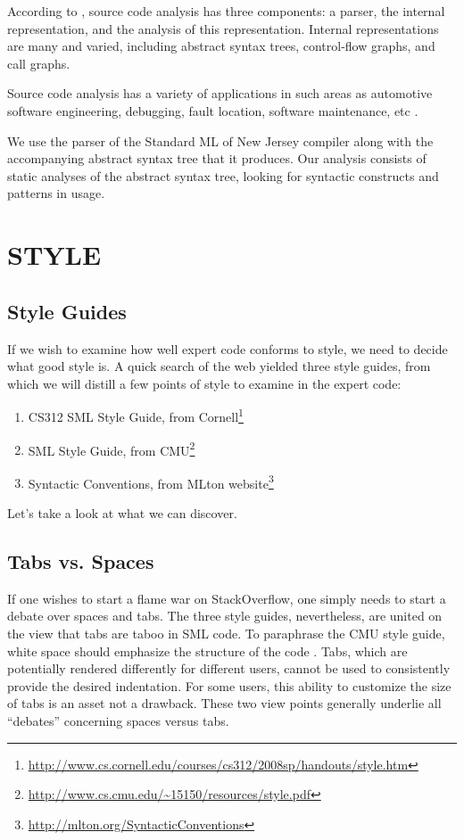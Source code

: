 \documentclass[12pt,abstracton]{scrartcl}
\begin{document}
According to \cite{Bin07}, source code analysis has three components: a parser,
the internal representation, and the analysis of this representation.
Internal representations are many and varied, including abstract syntax trees,
control-flow graphs, and call graphs.

Source code analysis has a variety of applications in such areas as
automotive software engineering, debugging, fault location, software maintenance,
etc \cite{Bin07}.

We use the parser of the Standard ML of New Jersey compiler along with the accompanying
abstract syntax tree that it produces. Our analysis
consists of static analyses of the abstract syntax tree, looking for
syntactic constructs and patterns in usage.
\section{STYLE}\label{sec:style}
\subsection{Style Guides}\label{subsec:guide}
If we wish to examine how well expert code conforms to style, we need to decide
what good style is. A quick search of the web yielded three style guides, from which
we will distill a few points of style to examine in the expert code:
\begin{enumerate}
\item CS312 SML Style Guide, from Cornell\footnote{\url{http://www.cs.cornell.edu/courses/cs312/2008sp/handouts/style.htm}}
\item SML Style Guide, from CMU\footnote{\url{http://www.cs.cmu.edu/~15150/resources/style.pdf}}
\item Syntactic Conventions, from MLton website\footnote{\url{http://mlton.org/SyntacticConventions}}
\end{enumerate}
Let's take a look at what we can discover.
\subsection{Tabs vs. Spaces}\label{subsec:tab}
If one wishes to start a flame war on StackOverflow, one simply needs to start
a debate over spaces and tabs. The three style guides, nevertheless, are
united on the view that tabs are taboo in SML code. To paraphrase the CMU
style guide, white space should emphasize the structure of the code \cite{Cmu12}.
Tabs, which are potentially rendered differently for
different users, cannot be used to consistently provide the desired indentation.
For some users, this ability to customize the size of tabs is an asset not
a drawback. These two view points generally underlie all ``debates'' concerning spaces versus tabs.
\end{document}
